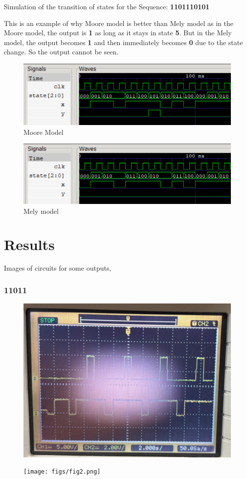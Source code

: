 \documentclass{article}
\begin{document}
Simulation of the transition of states for the Sequence: \textbf{1101110101}

This is an example of why Moore model is better than Mely model as in the Moore model, the output is \textbf{1} as long as it stays in state \textbf{5}. But in the Mely model, the output becomes \textbf{1} and then immediately becomes \textbf{0} due to the state change. So the output cannot be seen.
\begin{figure}
    \centering
    \includegraphics[width=1\linewidth]{figs/verilog.png}
    \caption{Moore Model}
    \label{fig:enter-label}
\end{figure}

\pagebreak

\begin{figure}
    \centering
    \includegraphics[width=1\linewidth]{figs/verilog1.png}
    \caption{Mely model}
    \label{fig:enter-label}
\end{figure}

\section{Results}
Images of circuits for some outputs,
\subsubsection{11011}
\begin{figure}[h!]
    \centering
    \includegraphics[width=0.7\linewidth]{figs/fig1.png}
    \label{fig:enter-label}
\end{figure}
\begin{figure}[h!]
    \centering
    \texttt{[image: figs/fig2.png]}
    \label{fig:enter-label}
\end{figure}
\pagebreak
\end{document}

